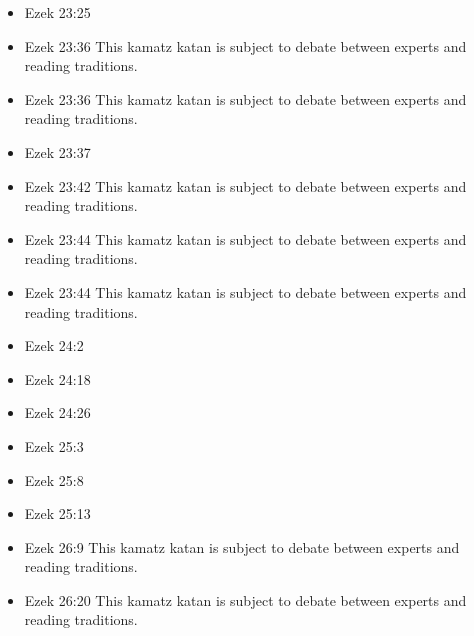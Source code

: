 \documentclass[14pt]{article}
\begin{document}
\begin{multicols}{2}
\begin{itemize}
												\item Ezek 23:25
												
												\item Ezek 23:36 This kamatz katan is subject to debate between experts and reading traditions.
												
												\item Ezek 23:36 This kamatz katan is subject to debate between experts and reading traditions.
												
												\item Ezek 23:37
												
												\item Ezek 23:42 This kamatz katan is subject to debate between experts and reading traditions.
												
												\item Ezek 23:44 This kamatz katan is subject to debate between experts and reading traditions.
												
												\item Ezek 23:44 This kamatz katan is subject to debate between experts and reading traditions.
												
												\item Ezek 24:2
												
												\item Ezek 24:18
												
												\item Ezek 24:26
												
												\item Ezek 25:3
												
												\item Ezek 25:8
												
												\item Ezek 25:13
												
												\item Ezek 26:9 This kamatz katan is subject to debate between experts and reading traditions.
												
												\item Ezek 26:20 This kamatz katan is subject to debate between experts and reading traditions.
												

\end{itemize}
\end{multicols}
\end{document}
